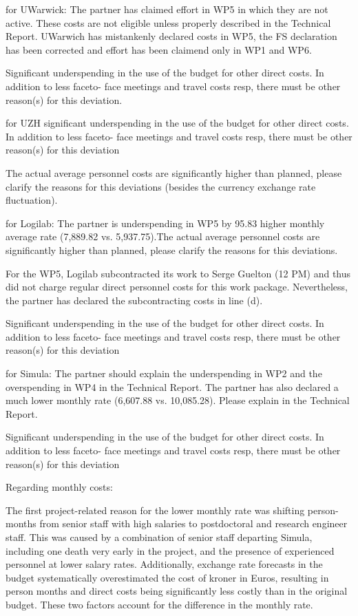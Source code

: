for UWarwick:
The partner has claimed effort in WP5 in which they are not active. These costs are not eligible
unless properly described in the Technical Report.
UWarwich has mistankenly declared costs in WP5, the FS declaration has been corrected and effort has been claimend only in WP1 and WP6. 

Significant underspending in the use of the budget for other direct costs. In addition to less faceto-
face meetings and travel costs resp, there must be other reason(s) for this deviation.

for UZH
significant underspending in the use of the budget for other direct costs. In addition to less faceto-
face meetings and travel costs resp, there must be other reason(s) for this deviation

The actual average personnel costs are significantly higher than planned, 
please clarify the reasons for this deviations (besides the currency exchange rate fluctuation).

for Logilab:
The partner is underspending in WP5 by 95.83%
higher monthly average rate (7,889.82 vs. 5,937.75).The actual average personnel costs are significantly higher than planned, 
please clarify the reasons for this deviations.

For the WP5, Logilab subcontracted its work to Serge Guelton (12 PM) and thus  did not charge regular direct personnel costs for this work package. Nevertheless, the partner has declared the subcontracting costs in line (d).

Significant underspending in the use of the budget for other direct costs. In addition to less faceto-
face meetings and travel costs resp, there must be other reason(s) for this deviation


for Simula:
The partner should explain the underspending in WP2 and the overspending in WP4 in the
Technical Report. The partner has also declared a much lower monthly rate (6,607.88 vs. 10,085.28). Please explain in the Technical Report.

Significant underspending in the use of the budget for other direct costs. In addition to less faceto-
face meetings and travel costs resp, there must be other reason(s) for this deviation

Regarding monthly costs:

The first project-related reason for the lower monthly rate was shifting person-months from senior staff with high salaries
to postdoctoral and research engineer staff.
This was caused by a combination of senior staff departing Simula, including one death very early in the project,
and the presence of experienced personnel at lower salary rates.
Additionally, exchange rate forecasts in the budget systematically overestimated the cost of kroner in Euros,
resulting in person months and direct costs being significantly less costly than in the original budget.
These two factors account for the difference in the monthly rate.


